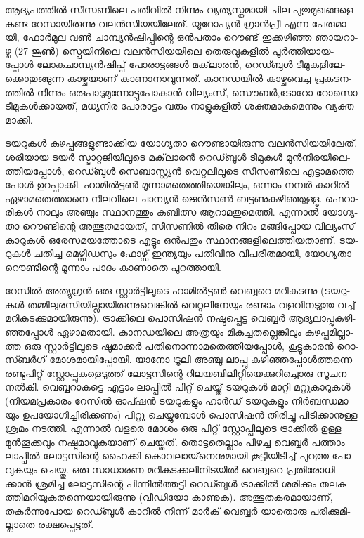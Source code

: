 \vskip 2pt

ആ­ദ്യ­പ­ത്തില്‍ സീ­സ­ണി­ലെ പതി­വില്‍ നി­ന്നും വ്യ­ത്യ­സ്ത­മാ­യി ചില പു­തു­മു­ഖ­ങ്ങ­ളെ കണ്ട റേ­സാ­യി­രു­ന്നു വലന്‍­സി­യ­യി­ലേ­ത്. 
­യൂ­റോ­പ്യന്‍ ഗ്രാന്‍­പ്രീ­ എന്ന പേ­രു­മാ­യി, ­ഫോര്‍­മുല വണ്‍ ചാ­മ്പ്യന്‍­ഷി­പ്പി­ന്റെ ഒന്‍­പ­താം റൌ­ണ്ട് ഇക്ക­ഴി­ഞ്ഞ ഞാ­യ­റാ­ഴ്ച (27
ജൂണ്‍) സ്പെ­യി­നി­ലെ വലന്‍­സി­യ­യി­ലെ തെ­രു­വു­ക­ളില്‍ പൂര്‍­ത്തി­യാ­യ­പ്പോള്‍ ലോ­ക­ചാ­മ്പ്യന്‍­ഷി­പ്പ് പോ­രാ­ട്ട­ങ്ങള്‍ മക്‌­ലാ­രന്‍,
­റെ­ഡ്ബുള്‍ ടീ­മു­ക­ളി­ലേ­ക്കൊ­തു­ങ്ങു­ന്ന കാ­ഴ്ച­യാ­ണ് കാ­ണാ­നാ­വു­ന്ന­ത്. കാ­ന­ഡ­യില്‍ കാ­ഴ്ച­വെ­ച്ച പ്ര­ക­ട­ന­ത്തില്‍ നി­ന്നും 
ഒരു­പാ­ടു­മു­ന്നോ­ട്ടു­പോ­കാന്‍ വി­ല്യം­സ്,­ സൌ­ബര്‍,­ടോ­റോ റോ­സൊ ടീ­മു­കള്‍­ക്കാ­യ­ത്, മധ്യ­നിര പോ­രാ­ട്ടം വരും നാ­ളു­ക­ളില്‍
ശക്ത­മാ­കു­മെ­ന്നും വ്യ­ക്ത­മാ­ക്കി.

­ട­യ­റു­കള്‍ കു­ഴ­പ്പ­ങ്ങ­ളു­ണ്ടാ­ക്കിയ യോ­ഗ്യ­താ റൌ­ണ്ടാ­യി­രു­ന്നു വലന്‍­സി­യ­യി­ലേ­ത്. ശരി­യായ ടയര്‍ സ്ട്രാ­റ്റ­ജി­യി­ലൂ­ടെ മക്‌­ലാ­രന്‍
­റെ­ഡ്ബുള്‍ ടീ­മു­കള്‍ മുന്‍­നി­ര­യി­ലെ­ത്തി­യ­പ്പോള്‍, റെ­ഡ്ബുള്‍ സെ­ബാ­സ്റ്റ്യന്‍ വെ­റ്റ­ലി­ലൂ­ടെ സീ­സ­ണി­ലെ എട്ടാ­മ­ത്തെ പോള്‍ 
ഉറ­പ്പാ­ക്കി. ഹാ­മില്‍­ട്ടണ്‍ മൂ­ന്നാ­മ­തെ­ത്തി­യെ­ങ്കി­ലും, ഒന്നാം നമ്പര്‍ കാ­റില്‍ ഏഴാ­മ­തെ­ത്താ­നെ നി­ല­വി­ലെ ചാ­മ്പ്യന്‍ ജെന്‍­സണ്‍
ബട്ട­ണു­ക­ഴി­ഞ്ഞു­ള്ളൂ. ഫെ­റാ­രി­കള്‍ നാ­ലും അഞ്ചും സ്ഥാ­ന­ത്തും കു­ബി­ത്സ ആറാ­മ­തു­മെ­ത്തി. എന്നാല്‍ യോ­ഗ്യ­താ റൌ­ണ്ടി­ന്റെ
അത്ഭു­ത­മാ­യ­ത്, സീ­സ­ണില്‍ തീ­രെ നി­റം മങ്ങി­പ്പോയ ­വി­ല്യം­സ് കാ­റു­കള്‍ ഒരേ­സ­മ­യ­ത്തോ­ടെ എട്ടും ഒന്‍­പ­തും 
സ്ഥാ­ന­ങ്ങ­ളി­ലെ­ത്തി­യ­താ­ണ്. ടയ­റു­കള്‍ ചതി­ച്ച മെ­ഴ്സി­ഡ­സും ഫോ­ഴ്സ് ഇന്ത്യ­യും പതി­വി­നു വി­പ­രീ­ത­മാ­യി, യോ­ഗ്യ­താ റൌ­ണ്ടി­ന്റെ
മൂ­ന്നാം പാ­ദം കാ­ണാ­തെ പു­റ­ത്താ­യി­.

­റേ­സില്‍ അത്യു­ഗ്രന്‍ ഒരു സ്റ്റാര്‍­ട്ടി­ലൂ­ടെ ഹാ­മില്‍­ട്ടണ്‍ വെ­ബ്ബ­റെ മറി­ക­ട­ന്നു ­(­ട­യ­റു­കള്‍ തമ്മി­ലു­ര­സി­യി­ല്ലാ­യി­രു­ന്നു­വെ­ങ്കില്‍ 
വെ­റ്റ­ലി­നേ­യും രണ്ടാം വള­വി­ന­ടു­ത്തു വച്ച് മറി­ക­ട­ക്കു­മാ­യി­രു­ന്നു­). ട്രാ­ക്കി­ലെ പൊ­സി­ഷന്‍ നഷ്ട­പ്പെ­ട്ട വെ­ബ്ബര്‍ 
ആദ്യ­ലാ­പ്പു­ക­ഴി­ഞ്ഞ­പ്പോള്‍ ഏഴാ­മ­താ­യി. കാ­ന­ഡ­യി­ലെ അത്ര­യും മി­ക­ച്ച­ത­ല്ലെ­ങ്കി­ലും കു­ഴ­പ്പ­മി­ല്ലാ­ത്ത ഒരു സ്റ്റാര്‍­ട്ടി­ലൂ­ടെ 
ഷു­മാ­ക്കര്‍ പതി­നൊ­ന്നാ­മ­തെ­ത്തി­യ­പ്പോള്‍, കൂ­ട്ടു­കാ­രന്‍ റൊ­സ്ബര്‍­ഗ് മോ­ശ­മാ­യി­പ്പോ­യി. ­യാ­നോ ട്രൂ­ലി­ അഞ്ചു ലാ­പ്പു 
കഴി­ഞ്ഞ­പ്പോള്‍­ത്ത­ന്നെ രണ്ടു­പി­റ്റ് സ്റ്റോ­പ്പു­ക­ളെ­ടു­ത്ത് ലോ­ട്ട­സി­ന്റെ റി­ല­യ­ബി­ലി­റ്റി­യെ­ക്കു­റി­ച്ചൊ­രു സൂ­ചന നല്‍­കി. 
വെ­ബ്ബ­റാ­ക­ട്ടെ എട്ടാം ലാ­പ്പില്‍ പി­റ്റ് ചെ­യ്ത് ടയ­റു­കള്‍ മാ­റ്റി മറ്റു­കാ­റു­കള്‍ (നി­യ­മ­പ്ര­കാ­രം റേ­സില്‍ ഓപ്ഷന്‍ ടയ­റു­ക­ളും 
ഹാര്‍­ഡ് ടയ­റു­ക­ളും നിര്‍­ബ­ന്ധ­മാ­യും ഉപ­യോ­ഗി­ച്ചി­രി­ക്ക­ണം) പി­റ്റു ചെ­യ്യു­മ്പോള്‍ പൊ­സി­ഷന്‍ തി­രി­ച്ചു പി­ടി­ക്കാ­നു­ള്ള ശ്ര­മം 
നട­ത്തി. എന്നാല്‍ വള­രെ മോ­ശം ഒരു പി­റ്റ് സ്റ്റോ­പ്പി­ലൂ­ടെ ട്രാ­ക്കില്‍ ഉള്ള മുന്‍­തൂ­ക്ക­വും നഷ്ട­മാ­വു­ക­യാ­ണ് ചെ­യ്ത­ത്. 
തൊ­ട്ട­തെ­ല്ലാം പി­ഴ­ച്ച വെ­ബ്ബര്‍ പത്താം ലാ­പ്പില്‍ ലോ­ട്ട­സി­ന്റെ ഹൈ­ക്കി കൊ­വ­ലാ­യ്‌­നെ­നു­മാ­യി കൂ­ട്ടി­യി­ടി­ച്ച് പു­റ­ത്തു 
പോ­വു­ക­യും ചെ­യ്തു. ഒരു സാ­ധാ­രണ മറി­ക­ട­ക്ക­ലി­നി­ട­യില്‍ വെ­ബ്ബ­റെ പ്ര­തി­രോ­ധി­ക്കാന്‍ ശ്ര­മി­ച്ച ലോ­ട്ട­സി­ന്റെ പി­ന്നില്‍­ത്ത­ട്ടി 
റെ­ഡ്ബുള്‍ ട്രാ­ക്കില്‍ ശരി­ക്കും തല­കു­ത്തി­മ­റി­യു­ക­ത­ന്നെ­യാ­യി­രു­ന്നു (വീഡിയോ കാ­ണു­ക). അത്ഭു­ത­ക­ര­മാ­യാ­ണ്, 
തകര്‍­ന്നു­പോയ റെ­ഡ്ബുള്‍ കാ­റില്‍ നി­ന്ന് ­മാര്‍­ക് വെ­ബ്ബര്‍ യാ­തൊ­രു പരി­ക്കു­മി­ല്ലാ­തെ രക്ഷ­പ്പെ­ട്ട­ത്.


